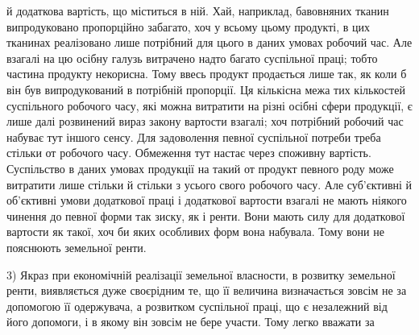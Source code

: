 й додаткова вартість, що міститься в ній. Хай, наприклад, бавовняних тканин
випродуковано пропорційно забагато, хоч у всьому цьому продукті, в цих тканинах
реалізовано лише потрібний для цього в даних умовах робочий час. Але взагалі
на цю осібну галузь витрачено надто багато суспільної праці; тобто частина
продукту некорисна. Тому ввесь продукт продається лише так, як коли б він
був випродукований в потрібній пропорції. Ця кількісна межа тих кількостей
суспільного робочого часу, які можна витратити на різні осібні сфери продукції,
є лише далі розвинений вираз закону вартости взагалі; хоч потрібний робочий
час набуває тут іншого сенсу. Для задоволення певної суспільної потреби треба
стільки от робочого часу. Обмеження тут настає через споживну вартість. Суспільство
в даних умовах продукції на такий от продукт певного роду може
витратити лише стільки й стільки з усього свого робочого часу. Але суб’єктивні
й об'єктивні умови додаткової праці і додаткової вартости взагалі не мають
ніякого чинення до певної форми так зиску, як і ренти. Вони мають силу для
додаткової вартости як такої, хоч би яких особливих форм вона набувала. Тому
вони не пояснюють земельної ренти.

3) Якраз при економічній реалізації земельної власности, в розвитку земельної
ренти, виявляється дуже своєрідним те, що її величина визначається
зовсім не за допомогою її одержувача, а розвитком суспільної праці, що є незалежний
від його допомоги, і в якому він зовсім не бере участи. Тому легко вважати за
\parbreak{}  %
